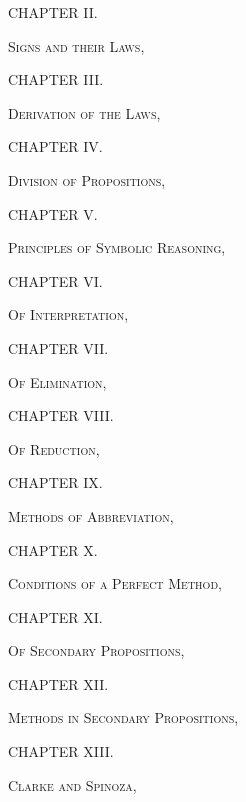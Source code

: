 \documentclass[oneside]{book}
\begin{document}
\large
\begin{center}
CHAPTER II.
\end{center}
\normalsize
\textsc{Signs and their Laws,}

\large
\begin{center}
CHAPTER III.
\end{center}
\normalsize
\textsc{Derivation of the Laws,}

\large
\begin{center}
CHAPTER IV.
\end{center}
\normalsize
\textsc{Division of Propositions,}

\large
\begin{center}
CHAPTER V.
\end{center}
\normalsize
\textsc{Principles of Symbolic Reasoning,}

\large
\begin{center}
CHAPTER VI.
\end{center}
\normalsize
\textsc{Of Interpretation,}

\large
\begin{center}
CHAPTER VII.
\end{center}
\normalsize
\textsc{Of Elimination,}

\large
\begin{center}
CHAPTER VIII.
\end{center}
\normalsize
\textsc{Of Reduction,}
\newpage
\large
\begin{center}
CHAPTER IX.
\end{center}
\normalsize
\textsc{Methods of Abbreviation,}

\large
\begin{center}
CHAPTER X.
\end{center}
\normalsize
\textsc{Conditions of a Perfect Method,}

\large
\begin{center}
CHAPTER XI.
\end{center}
\normalsize
\textsc{Of Secondary Propositions,}

\large
\begin{center}
CHAPTER XII.
\end{center}
\normalsize
\textsc{Methods in Secondary Propositions,}

\large
\begin{center}
CHAPTER XIII.
\end{center}
\normalsize
\textsc{Clarke and Spinoza,}
\end{document}
